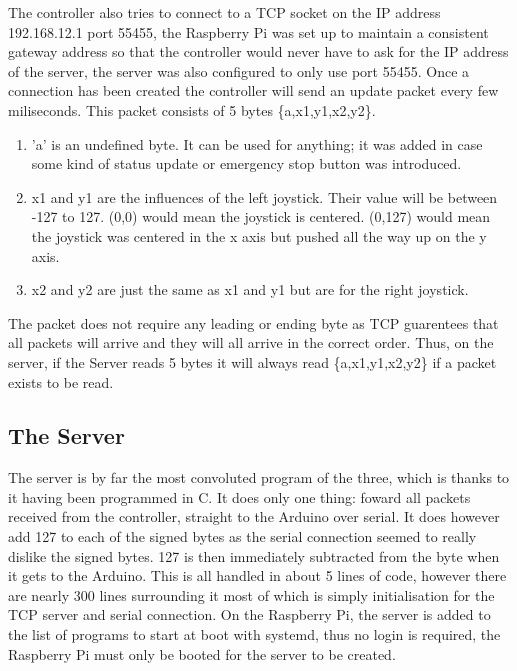 \par
The controller also tries to connect to a TCP socket on the IP address 192.168.12.1
port 55455, the Raspberry Pi was set up to maintain a consistent gateway address
so that the controller would never have to ask for the IP address of the server,
the server was also configured to only use port 55455.
Once a connection has been created the controller will send an update packet every
few miliseconds. This packet consists of 5 bytes \{a,x1,y1,x2,y2\}.
\begin{enumerate}
  \item 'a' is an undefined byte. It can be used for anything; it was added in case
   some kind of status update or emergency stop button was introduced.
  \item x1 and y1 are the influences of the left joystick. Their value will be
  between -127 to 127. (0,0) would mean the joystick is centered. (0,127) would mean
  the joystick was centered in the x axis but pushed all the way up on the y axis.
  \item x2 and y2 are just the same as x1 and y1 but are for the right joystick.
\end{enumerate}
The packet does not require any leading or ending byte as TCP guarentees that all
packets will arrive and they will all arrive in the correct order. Thus, on the server,
if the Server reads 5 bytes it will always read \{a,x1,y1,x2,y2\} if a packet exists to be read.

\subsection{The Server}
\par The server is by far the most convoluted program of the three, which is thanks
to it having been programmed in C.
It does only one thing:
 foward all packets received from the controller, straight to the Arduino over serial.
It does however add 127 to each of the signed bytes as the serial connection
seemed to really dislike the signed bytes. 127 is then immediately subtracted from
the byte when it gets to the Arduino.
This is all handled in about 5 lines of code, however there are nearly 300 lines
surrounding it most of which is simply initialisation for the TCP server and serial
connection.
On the Raspberry Pi, the server is added to the list of programs to start at boot
with systemd, thus no login is required, the Raspberry Pi must only be booted for
the server to be created.

